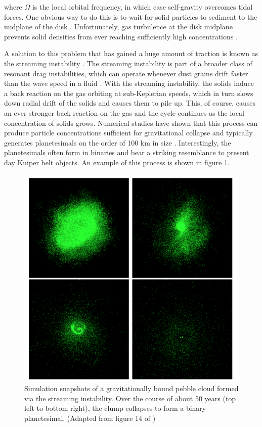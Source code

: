 \noindent where $\Omega$ is the local orbital frequency, in which case self-gravity overcomes tidal forces. One obvious way to do this is to wait for solid particles to sediment to the midplane of the disk \cite{goldreich73}. Unfortunately, gas turbulence at the disk midplane prevents solid densities from ever reaching sufficiently high concentrations \cite{cuzzi93}. 

 A solution to this problem that has gained a huge amount of traction is known as the streaming instability \cite{youdin05}. The streaming instability is part of a broader class of resonant drag instabilities, which can operate whenever dust grains drift faster than the wave speed in a fluid \cite{squire18, squire20}. With the streaming instability, the solids induce a back reaction on the gas orbiting at sub-Keplerian speeds, which in turn slows down radial drift of the solids and causes them to pile up. This, of course, causes an ever stronger back reaction on the gas and the cycle continues as the local concentration of solids grows. Numerical studies have shown that this process can produce particle concentrations sufficient for gravitational collapse and typically generates planetesimals on the order of 100 km in size \cite{johansen15, simon16, schafer17}. Interestingly, the planetesimals often form in binaries \cite{li19} and bear a striking resemblance to present day Kuiper belt objects. An example of this process is shown in figure \ref{fig:plCollapse}.
 
\begin{figure}
\begin{center}
    \includegraphics[width=\textwidth]{figures/intro/binaryPl.png}
    \caption{Simulation snapshots of a gravitationally bound pebble cloud formed via the streaming instability. Over the course of about 50 years (top left to bottom right), the clump collapses to form a binary planetesimal. (Adapted from figure 14 of \cite{nesvorny21})\label{fig:plCollapse}}
\end{center}
\end{figure}
 
